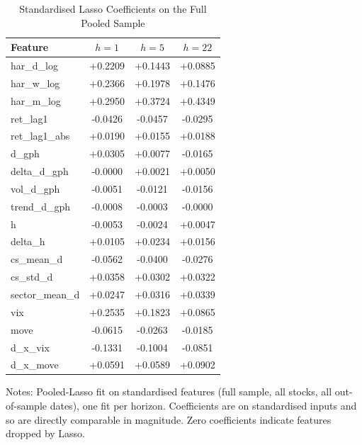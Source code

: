 
\begin{table}[htbp]
\centering
\caption{Standardised Lasso Coefficients on the Full Pooled Sample}
\label{tab:importance}
\small
\begin{tabular}{lccc}
\toprule
Feature & $h=1$ & $h=5$ & $h=22$ \\
\midrule
har\_d\_log & +0.2209 & +0.1443 & +0.0885 \\
har\_w\_log & +0.2366 & +0.1978 & +0.1476 \\
har\_m\_log & +0.2950 & +0.3724 & +0.4349 \\
ret\_lag1 & -0.0426 & -0.0457 & -0.0295 \\
ret\_lag1\_abs & +0.0190 & +0.0155 & +0.0188 \\
d\_gph & +0.0305 & +0.0077 & -0.0165 \\
delta\_d\_gph & -0.0000 & +0.0021 & +0.0050 \\
vol\_d\_gph & -0.0051 & -0.0121 & -0.0156 \\
trend\_d\_gph & -0.0008 & -0.0003 & -0.0000 \\
h & -0.0053 & -0.0024 & +0.0047 \\
delta\_h & +0.0105 & +0.0234 & +0.0156 \\
cs\_mean\_d & -0.0562 & -0.0400 & -0.0276 \\
cs\_std\_d & +0.0358 & +0.0302 & +0.0322 \\
sector\_mean\_d & +0.0247 & +0.0316 & +0.0339 \\
vix & +0.2535 & +0.1823 & +0.0865 \\
move & -0.0615 & -0.0263 & -0.0185 \\
d\_x\_vix & -0.1331 & -0.1004 & -0.0851 \\
d\_x\_move & +0.0591 & +0.0589 & +0.0902 \\
\bottomrule
\end{tabular}
\begin{tablenotes}\small
\item Notes: Pooled-Lasso fit on standardised features (full sample, all stocks, all out-of-sample dates), one fit per horizon. Coefficients are on standardised inputs and so are directly comparable in magnitude. Zero coefficients indicate features dropped by Lasso.
\end{tablenotes}
\end{table}
